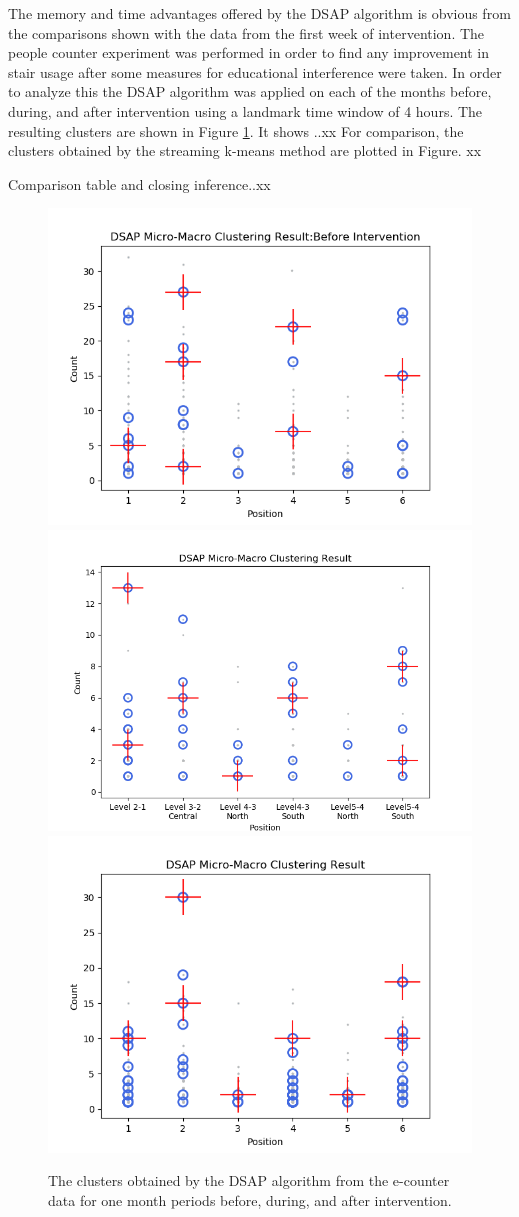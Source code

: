 The memory and time advantages offered by the DSAP algorithm is obvious from the comparisons shown with the data from the first week of intervention. The people counter experiment was performed in order to find any improvement in stair usage after some measures for educational interference were taken. In order to analyze this the DSAP algorithm was applied on each of the months before, during, and after intervention using a landmark time window of 4 hours. The resulting clusters are shown in Figure \ref{dsap3mon}. It shows ..xx
For comparison, the clusters obtained by the streaming k-means method are plotted in Figure. xx

Comparison table and closing inference..xx
\begin{figure}[!h]
    \centering
    \includegraphics[width=.47\textwidth]{image/Chapters/Chapter6/DSAPBeforeMonthIntervention.png}
    \includegraphics[width=.51\textwidth]{image/Chapters/Chapter6/window10H.png}
    \includegraphics[width=.49\textwidth]{image/Chapters/Chapter6/DSAPAFTERmonthIntervention.png}
    \caption{The clusters obtained by the DSAP algorithm from the e-counter data for one month periods before, during, and after intervention.}
    \label{dsap3mon}
\end{figure}

